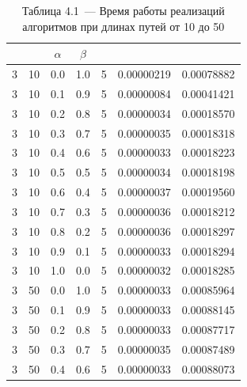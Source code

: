 \documentclass[12pt, a4paper]{report}
\begin{document}
	\begin{table} [H]
		\caption*{Таблица 4.1~--- Время работы реализаций алгоритмов при длинах путей от 10 до 50}
		\begin{tabular}[l]{|c c c c c c c|}
			\hline
			\text{Размер} & \text{Длина жизни} & $\alpha$ & $\beta$ & \text{Точность} & \text{Время полн. перебора} & \text{Время мурав.} \\\hline
			
			3 & 10 & 0.0 & 1.0 & 5 & 0.00000219 & 0.00078882 \\
			
			3 & 10 & 0.1 & 0.9 & 5 & 0.00000084 & 0.00041421 \\
			
			3 & 10 & 0.2 & 0.8 & 5 & 0.00000034 & 0.00018570 \\
			
			3 & 10 & 0.3 & 0.7 & 5 & 0.00000035 & 0.00018318 \\
			
			3 & 10 & 0.4 & 0.6 & 5 & 0.00000033 & 0.00018223 \\
			
			3 & 10 & 0.5 & 0.5 & 5 & 0.00000034 & 0.00018198 \\
			
			3 & 10 & 0.6 & 0.4 & 5 & 0.00000037 & 0.00019560 \\
			
			3 & 10 & 0.7 & 0.3 & 5 & 0.00000036 & 0.00018212 \\
			
			3 & 10 & 0.8 & 0.2 & 5 & 0.00000036 & 0.00018297 \\
			
			3 & 10 & 0.9 & 0.1 & 5 & 0.00000033 & 0.00018294 \\
			
			3 & 10 & 1.0 & 0.0 & 5 & 0.00000032 & 0.00018285 \\
			
			3 & 50 & 0.0 & 1.0 & 5 & 0.00000033 & 0.00085964 \\
			
			3 & 50 & 0.1 & 0.9 & 5 & 0.00000033 & 0.00088145 \\
			
			3 & 50 & 0.2 & 0.8 & 5 & 0.00000033 & 0.00087717 \\
			
			3 & 50 & 0.3 & 0.7 & 5 & 0.00000035 & 0.00087489 \\
			
			3 & 50 & 0.4 & 0.6 & 5 & 0.00000033 & 0.00088073 \\
			

\end{tabular}
\end{table}
\end{document}
